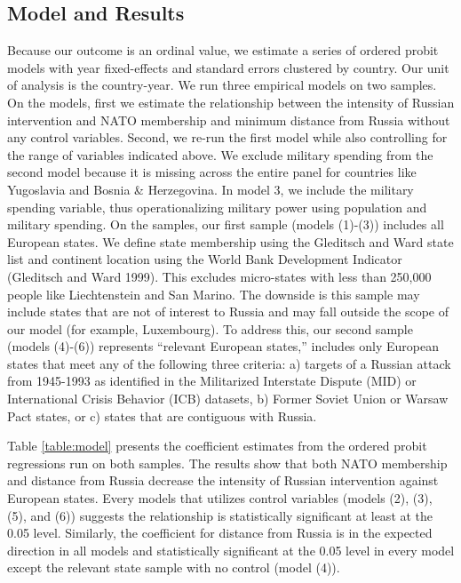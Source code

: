 \documentclass[
]{article}
\begin{document}
\hypertarget{model-and-results}{%
\subsection{Model and Results}\label{model-and-results}}

Because our outcome is an ordinal value, we estimate a series of ordered probit models with year fixed-effects and standard errors clustered by country. Our unit of analysis is the country-year. We run three empirical models on two samples. On the models, first we estimate the relationship between the intensity of Russian intervention and NATO membership and minimum distance from Russia without any control variables. Second, we re-run the first model while also controlling for the range of variables indicated above. We exclude military spending from the second model because it is missing across the entire panel for countries like Yugoslavia and Bosnia \& Herzegovina. In model 3, we include the military spending variable, thus operationalizing military power using population and military spending. On the samples, our first sample (models (1)-(3)) includes all European states. We define state membership using the Gleditsch and Ward state list and continent location using the World Bank Development Indicator (Gleditsch and Ward 1999). This excludes micro-states with less than 250,000 people like Liechtenstein and San Marino. The downside is this sample may include states that are not of interest to Russia and may fall outside the scope of our model (for example, Luxembourg). To address this, our second sample (models (4)-(6)) represents ``relevant European states,'' includes only European states that meet any of the following three criteria: a) targets of a Russian attack from 1945-1993 as identified in the Militarized Interstate Dispute (MID) or International Crisis Behavior (ICB) datasets, b) Former Soviet Union or Warsaw Pact states, or c) states that are contiguous with Russia.



Table \ref{table:model} presents the coefficient estimates from the ordered probit regressions run on both samples. The results show that both NATO membership and distance from Russia decrease the intensity of Russian intervention against European states. Every models that utilizes control variables (models (2), (3), (5), and (6)) suggests the relationship is statistically significant at least at the 0.05 level. Similarly, the coefficient for distance from Russia is in the expected direction in all models and statistically significant at the 0.05 level in every model except the relevant state sample with no control (model (4)).
\end{document}
